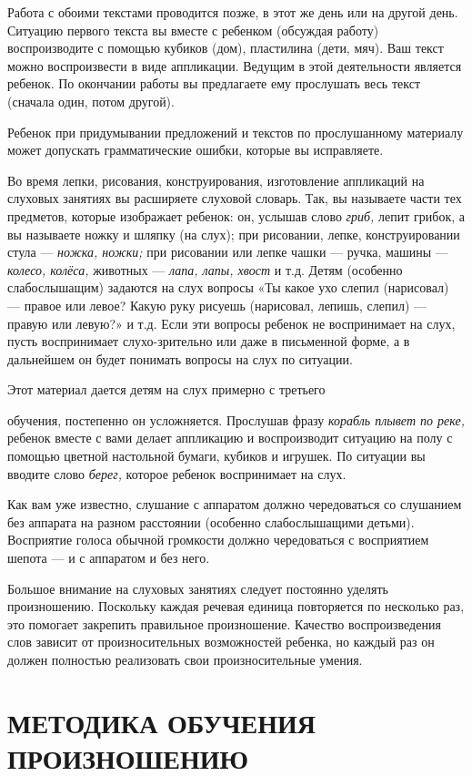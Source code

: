 \documentclass[a5paper]{book}
\renewcommand{\emph}[1]{\textit{#1}}
\begin{document}
Работа с обоими текстами проводится позже, в этот же день или на другой
день. Ситуацию первого текста вы вместе с ребенком (обсуждая работу)
воспроизводите с помощью кубиков (дом), пластилина (дети, мяч). Ваш
текст можно воспроизвести в виде аппликации. Ведущим в этой деятельности
является ребенок. По окончании работы вы предлагаете ему прослушать весь
текст (сначала один, потом другой).

Ребенок при придумывании предложений и текстов по прослушанному
материалу может допускать грамматические ошибки, которые вы исправляете.

Во время лепки, рисования, конструирования, изготовление аппликаций на
слуховых занятиях вы расширяете слуховой словарь. Так, вы называете
части тех предметов, которые изображает ребенок: он, услышав слово
\emph{гриб,} лепит грибок, а вы называете ножку и шляпку (на слух); при
рисовании, лепке, конструировании стула --- \emph{ножка, ножки;} при
рисовании или лепке чашки --- ручка, машины --- \emph{колесо, колёса,}
животных --- \emph{лапа, лапы, хвост} и т.д. Детям (особенно
слабослышащим) задаются на слух вопросы «Ты какое ухо слепил (нарисовал)
--- правое или левое? Какую руку рисуешь (нарисовал, лепишь, слепил) ---
правую или левую?» и т.д. Если эти вопросы ребенок не воспринимает на
слух, пусть воспринимает слухо-зрительно или даже в письменной форме, а
в дальнейшем он будет понимать вопросы на слух по ситуации.

Этот материал дается детям на слух примерно с третьего

обучения, постепенно он усложняется. Прослушав фразу \emph{корабль
плывет по реке,} ребенок вместе с вами делает аппликацию и воспроизводит
ситуацию на полу с помощью цветной настольной бумаги, кубиков и игрушек.
По ситуации вы вводите слово \emph{берег,} которое ребенок воспринимает
на слух.

Как вам уже известно, слушание с аппаратом должно чередоваться со
слушанием без аппарата на разном расстоянии (особенно слабослышащими
детьми). Восприятие голоса обычной громкости должно чередоваться с
восприятием шепота --- и с аппаратом и без него.

Большое внимание на слуховых занятиях следует постоянно уделять
произношению. Поскольку каждая речевая единица повторяется по несколько
раз, это помогает закрепить правильное произношение. Качество
воспроизведения слов зависит от произносительных возможностей ребенка,
но каждый раз он должен полностью реализовать свои произносительные
умения.

\section{МЕТОДИКА ОБУЧЕНИЯ ПРОИЗНОШЕНИЮ}
\end{document}
